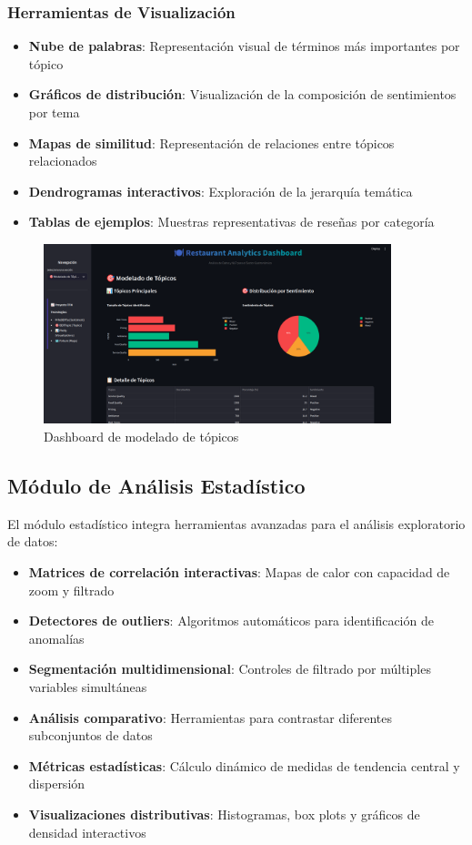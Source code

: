\documentclass[12pt,a4paper,twoside,openany]{book}
\begin{document}
\subsubsection{Herramientas de Visualización}
\begin{itemize}
    \item \textbf{Nube de palabras}: Representación visual de términos más importantes por tópico
    \item \textbf{Gráficos de distribución}: Visualización de la composición de sentimientos por tema
    \item \textbf{Mapas de similitud}: Representación de relaciones entre tópicos relacionados
    \item \textbf{Dendrogramas interactivos}: Exploración de la jerarquía temática
    \item \textbf{Tablas de ejemplos}: Muestras representativas de reseñas por categoría
\end{itemize}

\begin{figure}[H]
\centering
\includegraphics[width=0.9\textwidth]{figures/streamlit_topic_modeling.png}
\caption{Dashboard de modelado de tópicos}
\label{fig:streamlit_topic_modeling}
\end{figure}

\subsection{Módulo de Análisis Estadístico}

El módulo estadístico integra herramientas avanzadas para el análisis exploratorio de datos:

\begin{itemize}
    \item \textbf{Matrices de correlación interactivas}: Mapas de calor con capacidad de zoom y filtrado
    \item \textbf{Detectores de outliers}: Algoritmos automáticos para identificación de anomalías
    \item \textbf{Segmentación multidimensional}: Controles de filtrado por múltiples variables simultáneas
    \item \textbf{Análisis comparativo}: Herramientas para contrastar diferentes subconjuntos de datos
    \item \textbf{Métricas estadísticas}: Cálculo dinámico de medidas de tendencia central y dispersión
    \item \textbf{Visualizaciones distributivas}: Histogramas, box plots y gráficos de densidad interactivos
\end{itemize}
\end{document}
